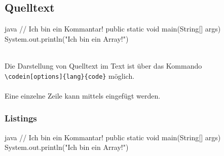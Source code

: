 \newpage
\subsection{Quelltext}
\begin{listing}
\ifminted   {}
\else       {}\fi
\begin{code}[firstnumber=last]{java}
// Ich bin ein Kommantar!
public static void main(String[] args) {
    System.out.println("Ich bin ein Array!")
}
\end{code}
\ifminted   {}
\else       {}\fi

\caption{Java Code}
\label{lst:java-code}
\end{listing}
~\\
Die Darstellung von Quelltext im Text ist über das Kommando \verb|\codein[options]{lang}{code}| möglich.
\\\\
Eine einzelne Zeile kann mittels
\ifminted   {}
\else       {}\fi
eingefügt werden.

\subsubsection{Listings}
\begin{listing}
\ifminted   {}
\else       {}\fi
\begin{code}[firstnumber=last]{java}
// Ich bin ein Kommantar!
public static void main(String[] args) {
    System.out.println("Ich bin ein Array!")
}
\end{code}
\ifminted   {}
\else       {}\fi
\caption{Java Lstlisting}
\label{lst:java-lstlisting}
\end{listing}

